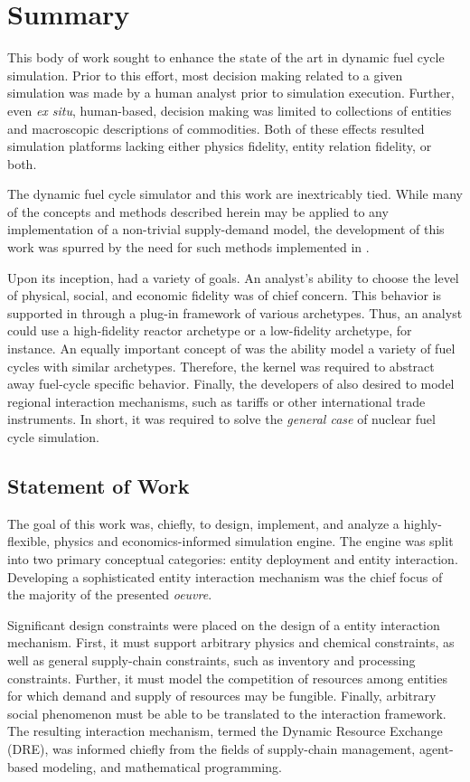\chapter{Summary}\label{ch:summary}

This body of work sought to enhance the state of the art in dynamic fuel cycle
simulation. Prior to this effort, most decision making related to a given
simulation was made by a human analyst prior to simulation execution. Further,
even \textit{ex situ}, human-based, decision making was limited to collections
of entities and macroscopic descriptions of commodities. Both of these effects
resulted simulation platforms lacking either physics fidelity, entity relation
fidelity, or both.

The \Cyclus dynamic fuel cycle simulator and this work are inextricably
tied. While many of the concepts and methods described herein may be applied to
any implementation of a non-trivial supply-demand model, the development of this
work was spurred by the need for such methods implemented in \Cyclus. 

Upon its inception, \Cyclus had a variety of goals. An analyst's ability to
choose the level of physical, social, and economic fidelity was of chief
concern. This behavior is supported in \Cyclus through a plug-in framework of
various archetypes. Thus, an analyst could use a high-fidelity reactor archetype
or a low-fidelity archetype, for instance. An equally important concept of
\Cyclus was the ability model a variety of fuel cycles with similar
archetypes. Therefore, the \Cyclus kernel was required to abstract away
fuel-cycle specific behavior. Finally, the developers of \Cyclus also desired to
model regional interaction mechanisms, such as tariffs or other international
trade instruments. In short, it was required to solve the \textit{general case}
of nuclear fuel cycle simulation.

\section{Statement of Work}

The goal of this work was, chiefly, to design, implement, and analyze a
highly-flexible, physics and economics-informed simulation engine. The engine
was split into two primary conceptual categories: entity deployment and entity
interaction. Developing a sophisticated entity interaction mechanism was the
chief focus of the majority of the presented \textit{oeuvre}.

Significant design constraints were placed on the design of a entity interaction
mechanism. First, it must support arbitrary physics and chemical constraints, as
well as general supply-chain constraints, such as inventory and processing
constraints. Further, it must model the competition of resources among entities
for which demand and supply of resources may be fungible. Finally, arbitrary
social phenomenon must be able to be translated to the interaction
framework. The resulting interaction mechanism, termed the Dynamic Resource
Exchange (DRE), was informed chiefly from the fields of supply-chain management,
agent-based modeling, and mathematical programming.

